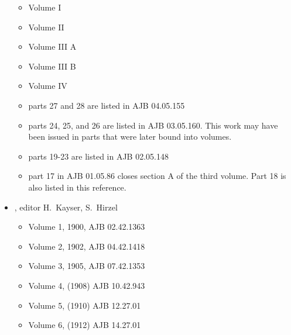 \begin{itemize}
    \begin{itemize}
      \item Volume I
      \item Volume II
      \item Volume III A
      \item Volume III B
      \item Volume IV
      \item parts 27 and 28 are listed in AJB 04.05.155
      \item parts 24, 25, and 26 are listed in AJB 03.05.160. This
        work may have been issued in parts that were later bound into
        volumes.
      \item parts 19-23 are listed in AJB 02.05.148
      \item part 17 in AJB 01.05.86 closes section A of the
        third volume. Part 18 is also listed in this reference.
    \end{itemize}
  
\item {}, editor H.~Kayser, S.~Hirzel
  \begin{itemize}
  \item Volume 1, 1900, AJB 02.42.1363
  \item Volume 2, 1902, AJB 04.42.1418
  \item Volume 3, 1905, AJB 07.42.1353
  \item Volume 4, (1908) AJB 10.42.943
  \item Volume 5, (1910) AJB 12.27.01
  \item Volume 6, (1912) AJB 14.27.01
  \end{itemize}
  

\end{itemize}
